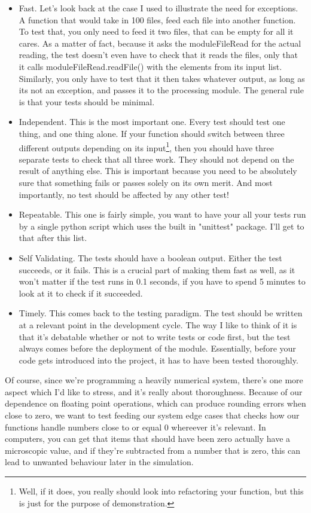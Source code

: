 \documentclass[10pt,a4paper]{article}
\begin{document}
\begin{itemize} 
\item Fast. Let's look back at the case I used to illustrate the need for exceptions. A function that would take in 100 files, feed each file into another function. To test that, you only need to feed it two files, that can be empty for all it cares. As a matter of fact, because it asks the moduleFileRead for the actual reading, the test doesn't even have to check that it reads the files, only that it calls moduleFileRead.readFile() with the elements from its input list. Similarly, you only have to test that it then takes whatever output, as long as its not an exception, and passes it to the processing module. The general rule is that your tests should be minimal.
\item Independent. This is the most important one. Every test should test one thing, and one thing alone. If your function should switch between three different outputs depending on its input\footnote{Well, if it does, you really should look into refactoring your function, but this is just for the purpose of demonstration.}, then you should have three separate tests to check that all three work. They should not depend on the result of anything else. This is important because you need to be absolutely sure that something fails or passes solely on its own merit. And most importantly, no test should be affected by any other test!
\item Repeatable. This one is fairly simple, you want to have your all your tests run by a single python script which uses the built in "unittest" package. I'll get to that after this list.
\item Self Validating. The tests should have a boolean output. Either the test succeeds, or it fails. This is a crucial part of making them fast as well, as it won't matter if the test runs in 0.1 seconds, if you have to spend 5 minutes to look at it to check if it succeeded.
\item Timely. This comes back to the testing paradigm. The test should be written at a relevant point in the development cycle. The way I like to think of it is that it's debatable whether or not to write tests or code first, but the test always comes before the deployment of the module. Essentially, before your code gets introduced into the project, it has to have been tested thoroughly.  
\end{itemize}

Of course, since we're programming a heavily numerical system, there's one more aspect which I'd like to stress, and it's really about thoroughness. Because of our dependence on floating point operations, which can produce rounding errors when close to zero, we want to test feeding our system edge cases that checks how our functions handle numbers close to or equal 0 whereever it's relevant. In computers, you can get that items that should have been zero actually have a microscopic value, and if they're subtracted from a number that is zero, this can lead to unwanted behaviour later in the simulation. 
\end{document}
